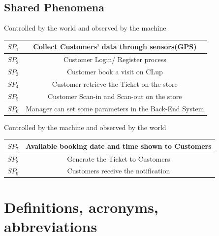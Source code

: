 \documentclass[a4paper,12pt]{report}
\begin{document}
\subsection{Shared Phenomena}
Controlled by the world and observed by the machine\\
\begin{center}
	\begin{tabular}{ c|c } 
		\hline
		$SP_1$ & Collect Customers' data through sensors(GPS) \\ 
		\hline
		$SP_2$ & Customer Login/ Register process \\ 
		\hline
		$SP_3$ & Customer book a visit on CLup \\ 
		\hline
		$SP_4$ & Customer retrieve the Ticket on the store\\ 
		\hline
		$SP_5$ & Customer Scan-in and Scan-out on the store\\ 
		\hline
		$SP_6$ & Manager can set some parameters in the Back-End System \\ 
		\hline
	\end{tabular}
\end{center}


Controlled by the machine and observed by the world \\
\begin{center}
	\begin{tabular}{ c|c } 
		\hline
		$SP_7$ &  Available booking date and time shown to Customers \\ 
		\hline
		$SP_8$ &  Generate the Ticket to Customers \\ 
		\hline
		$SP_9$ &  Customers receive the notification \\ 
		\hline
	\end{tabular}
\end{center}


\section{Definitions, acronyms, abbreviations}
\end{document}
